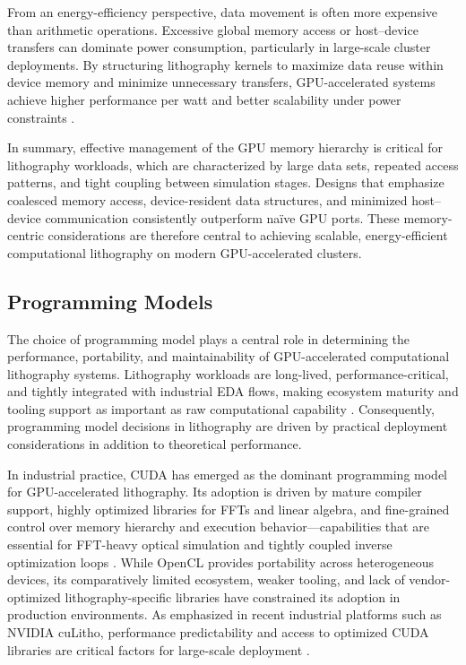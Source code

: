 \documentclass[pdflatex,sn-mathphys-num]{sn-jnl}%
\theoremstyle{thmstyleone}%
\theoremstyle{thmstyletwo}%
\theoremstyle{thmstylethree}%
\begin{document}
From an energy-efficiency perspective, data movement is often more expensive than arithmetic operations. Excessive global memory access or host–device transfers can dominate power consumption, particularly in large-scale cluster deployments. By structuring lithography kernels to maximize data reuse within device memory and minimize unnecessary transfers, GPU-accelerated systems achieve higher performance per watt and better scalability under power constraints \cite{kirk10,Cao2023}.

In summary, effective management of the GPU memory hierarchy is critical for lithography workloads, which are characterized by large data sets, repeated access patterns, and tight coupling between simulation stages. Designs that emphasize coalesced memory access, device-resident data structures, and minimized host–device communication consistently outperform naïve GPU ports. These memory-centric considerations are therefore central to achieving scalable, energy-efficient computational lithography on modern GPU-accelerated clusters.

\subsection{Programming Models}
The choice of programming model plays a central role in determining the performance, portability, and maintainability of GPU-accelerated computational lithography systems. Lithography workloads are long-lived, performance-critical, and tightly integrated with industrial EDA flows, making ecosystem maturity and tooling support as important as raw computational capability  \cite{4490127,kirk10}. Consequently, programming model decisions in lithography are driven by practical deployment considerations in addition to theoretical performance.

In industrial practice, CUDA has emerged as the dominant programming model for GPU-accelerated lithography. Its adoption is driven by mature compiler support, highly optimized libraries for FFTs and linear algebra, and fine-grained control over memory hierarchy and execution behavior—capabilities that are essential for FFT-heavy optical simulation and tightly coupled inverse optimization loops  \cite{kirk10,Zheng2023}. While OpenCL provides portability across heterogeneous devices, its comparatively limited ecosystem, weaker tooling, and lack of vendor-optimized lithography-specific libraries have constrained its adoption in production environments. As emphasized in recent industrial platforms such as NVIDIA cuLitho, performance predictability and access to optimized CUDA libraries are critical factors for large-scale deployment \cite{Singh}.
\end{document}
